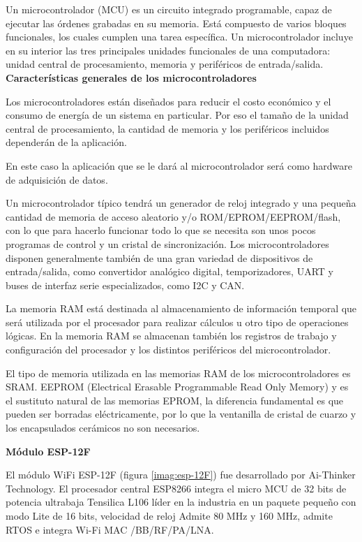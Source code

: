    Un microcontrolador (MCU) es un circuito integrado programable, capaz de ejecutar las órdenes grabadas en su memoria. Está compuesto de varios bloques funcionales, los cuales cumplen una tarea específica. Un microcontrolador incluye en su interior las tres principales unidades funcionales de una computadora: unidad central de procesamiento, memoria y periféricos de entrada/salida.\\

    \textbf{Características generales de los microcontroladores}

    Los microcontroladores están diseñados para reducir el costo económico y el consumo de energía de un sistema en particular. Por eso el tamaño de la unidad central de procesamiento, la cantidad de memoria y los periféricos incluidos dependerán de la aplicación.

    En este caso la aplicación que se le dará al microcontrolador será como hardware de adquisición de datos.

    Un microcontrolador típico tendrá un generador de reloj integrado y una pequeña cantidad de memoria de acceso aleatorio y/o ROM/EPROM/EEPROM/flash, con lo que para hacerlo funcionar todo lo que se necesita son unos pocos programas de control y un cristal de sincronización. Los microcontroladores disponen
    generalmente también de una gran variedad de dispositivos de entrada/salida, como convertidor analógico digital, temporizadores, UART y buses de interfaz serie especializados, como I2C y CAN.

    La memoria RAM está destinada al almacenamiento de información temporal que será utilizada por el procesador para realizar cálculos u otro tipo de operaciones lógicas. En la memoria RAM se almacenan también los registros de trabajo y configuración del procesador y los distintos periféricos del microcontrolador.

    El tipo de memoria utilizada en las memorias RAM de los microcontroladores es SRAM.
    EEPROM (Electrical Erasable Programmable Read Only Memory) y  es el sustituto natural de las memorias EPROM, la diferencia fundamental es que pueden ser borradas eléctricamente, por lo que la ventanilla de cristal de cuarzo y los encapsulados cerámicos no son necesarios.

    \newpage

    \textbf{Módulo ESP-12F}

    El módulo WiFi ESP-12F (figura \ref{imag:esp-12F}) fue desarrollado por Ai-Thinker Technology. El procesador central ESP8266 integra el micro MCU de 32 bits de potencia ultrabaja Tensilica L106 líder en la industria en un paquete pequeño con modo Lite de 16 bits, velocidad de reloj Admite 80 MHz y 160 MHz, admite RTOS e integra Wi-Fi MAC /BB/RF/PA/LNA.

